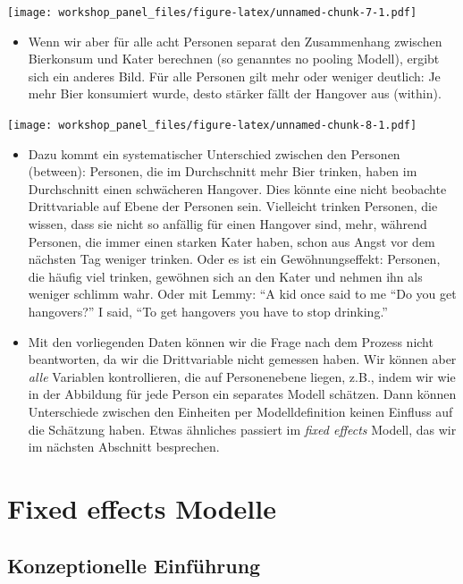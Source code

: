 \documentclass[]{book}
\providecommand{\tightlist}{%
  \setlength{\itemsep}{0pt}\setlength{\parskip}{0pt}}
\begin{document}
\texttt{[image: workshop\_panel\_files/figure-latex/unnamed-chunk-7-1.pdf]}

\begin{itemize}
\tightlist
\item
  Wenn wir aber für alle acht Personen separat den Zusammenhang zwischen Bierkonsum und Kater berechnen (so genanntes no pooling Modell), ergibt sich ein anderes Bild. Für alle Personen gilt mehr oder weniger deutlich: Je mehr Bier konsumiert wurde, desto stärker fällt der Hangover aus (within).
\end{itemize}

\texttt{[image: workshop\_panel\_files/figure-latex/unnamed-chunk-8-1.pdf]}

\begin{itemize}
\item
  Dazu kommt ein systematischer Unterschied zwischen den Personen (between): Personen, die im Durchschnitt mehr Bier trinken, haben im Durchschnitt einen schwächeren Hangover. Dies könnte eine nicht beobachte Drittvariable auf Ebene der Personen sein. Vielleicht trinken Personen, die wissen, dass sie nicht so anfällig für einen Hangover sind, mehr, während Personen, die immer einen starken Kater haben, schon aus Angst vor dem nächsten Tag weniger trinken. Oder es ist ein Gewöhnungseffekt: Personen, die häufig viel trinken, gewöhnen sich an den Kater und nehmen ihn als weniger schlimm wahr. Oder mit Lemmy: ``A kid once said to me ``Do you get hangovers?'' I said, ``To get hangovers you have to stop drinking.''
\item
  Mit den vorliegenden Daten können wir die Frage nach dem Prozess nicht beantworten, da wir die Drittvariable nicht gemessen haben. Wir können aber \emph{alle} Variablen kontrollieren, die auf Personenebene liegen, z.B., indem wir wie in der Abbildung für jede Person ein separates Modell schätzen. Dann können Unterschiede zwischen den Einheiten per Modelldefinition keinen Einfluss auf die Schätzung haben. Etwas ähnliches passiert im \emph{fixed effects} Modell, das wir im nächsten Abschnitt besprechen.
\end{itemize}

\hypertarget{fixed-effects-modelle}{%
\chapter{Fixed effects Modelle}\label{fixed-effects-modelle}}

\hypertarget{konzeptionelle-einfuxfchrung}{%
\section{Konzeptionelle Einführung}\label{konzeptionelle-einfuxfchrung}}
\end{document}
